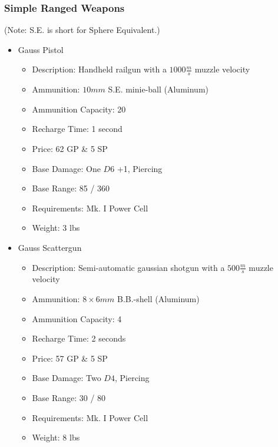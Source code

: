 \documentclass[12pt, landscape]{article}
\begin{document}
\begin{FlushLeft}
\begin{multicols}{2}
			\subsubsection{Simple Ranged Weapons}
			(Note: S.E. is short for Sphere Equivalent.)
			\begin{itemize}
				\item Gauss Pistol
				\begin{itemize}
					\item Description: Handheld railgun with a $1000 \frac{m}{s}$ muzzle velocity
					\item Ammunition: $10mm$ S.E. minie-ball (Aluminum)
					\item Ammunition Capacity: 20
					\item Recharge Time: 1 second
					\item Price: 62 GP \& 5 SP
					\item Base Damage: One $D6$ +1, Piercing
					\item Base Range: 85 / 360
					\item Requirements: Mk. I Power Cell
					\item Weight: 3 lbs
				\end{itemize}
				\item Gauss Scattergun
				\begin{itemize}
					\item Description: Semi-automatic gaussian shotgun with a $500 \frac{m}{s}$ muzzle velocity
					\item Ammunition: $8 \times 6mm$ B.B.-shell (Aluminum)
					\item Ammunition Capacity: 4
					\item Recharge Time: 2 seconds
					\item Price: 57 GP \& 5 SP
					\item Base Damage: Two $D4$, Piercing
					\item Base Range: 30 / 80
					\item Requirements: Mk. I Power Cell
					\item Weight: 8 lbs
				\end{itemize}
			\end{itemize}


\end{multicols}
\end{FlushLeft}
\end{document}
